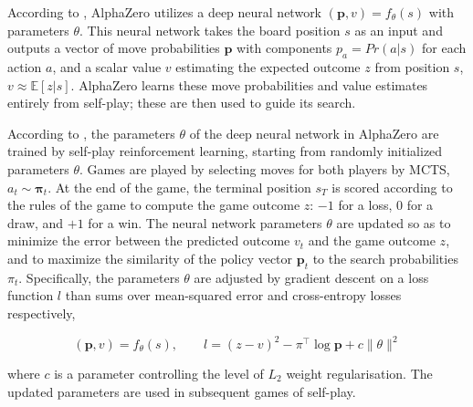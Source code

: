 

According to \cite{silver2017masteringchessshogiselfplay}, AlphaZero utilizes a deep neural network $(\mathbf{p}, v) = f_\theta(s)$ with parameters $\theta$. This neural network takes the board position $s$ as an input and outputs a vector of move probabilities $\mathbf{p}$ with components $p_a = Pr(a|s)$ for each action $a$, and a scalar value $v$ estimating the expected outcome $z$ from position $s$, $v \approx \mathbb{E}[z|s]$. AlphaZero learns these move probabilities and value estimates entirely from self-play; these are then used to guide its search.

According to \cite{silver2017masteringchessshogiselfplay}, the parameters $\theta$ of the deep neural network in AlphaZero are trained by self-play reinforcement learning, starting from randomly initialized parameters $\theta$. Games are played by selecting moves for both players by MCTS, $a_t \sim \mathbf{\pi}_t$. At the end of the game, the terminal position $s_T$ is scored according to the rules of the game to compute the game outcome $z$: $-1$ for a loss, $0$ for a draw, and $+1$ for a win. The neural network parameters $\theta$ are updated so as to minimize the error between the predicted outcome $v_t$ and the game outcome $z$, and to maximize the similarity of the policy vector $\mathbf{p}_t$ to the search probabilities $\pi_t$. Specifically, the parameters $\theta$ are adjusted by gradient descent on a loss function $l$ than sums over mean-squared error and cross-entropy losses respectively,

\begin{equation}\label{eq:loss-ref}
    (\mathbf{p}, v) = f_\theta(s), \qquad l = (z - v)^2 - \pi^\top \log \mathbf{p} + c\lVert\theta\rVert^2
\end{equation}

where $c$ is a parameter controlling the level of $L_2$ weight regularisation. The updated parameters are used in subsequent games of self-play.

